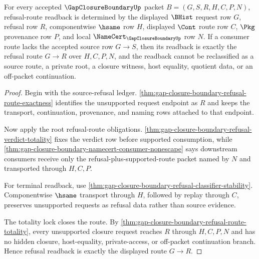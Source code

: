 \begin{theorem}
\label{thm:gap-closure-boundary-refusal-route-readback}
For every accepted $\GapClosureBoundaryUp$ packet $B=(G,S,R,H,C,P,N)$, refusal-route readback is determined by the displayed $\BHist$ request row $G$, refusal row $R$, componentwise $\hsame$ row $H$, displayed $\Cont$ route row $C$, $\Pkg$ provenance row $P$, and local $\NameCert_{\GapClosureBoundaryUp}$ row $N$. If a consumer route lacks the accepted source row $G \longrightarrow S$, then its readback is exactly the refusal route $G \longrightarrow R$ over $H,C,P,N$, and the readback cannot be reclassified as a source route, a private root, a closure witness, host equality, quotient data, or an off-packet continuation.
\end{theorem}
\begin{proof}
Begin with the source-refusal ledger. \autoref{thm:gap-closure-boundary-refusal-route-exactness} identifies the unsupported request endpoint as $R$ and keeps the transport, continuation, provenance, and naming rows attached to that endpoint.

Now apply the root refusal-route obligations. \autoref{thm:gap-closure-boundary-refusal-verdict-totality} fixes the verdict row before supported consumption, while \autoref{thm:gap-closure-boundary-namecert-consumer-nonescape} says downstream consumers receive only the refusal-plus-supported-route packet named by $N$ and transported through $H,C,P$.

For terminal readback, use \autoref{thm:gap-closure-boundary-refusal-classifier-stability}. Componentwise $\hsame$ transport through $H$, followed by replay through $C$, preserves unsupported requests as refusal data rather than source evidence.

The totality lock closes the route. By \autoref{thm:gap-closure-boundary-refusal-route-totality}, every unsupported closure request reaches $R$ through $H,C,P,N$ and has no hidden closure, host-equality, private-access, or off-packet continuation branch. Hence refusal readback is exactly the displayed route $G \longrightarrow R$.
\end{proof}

